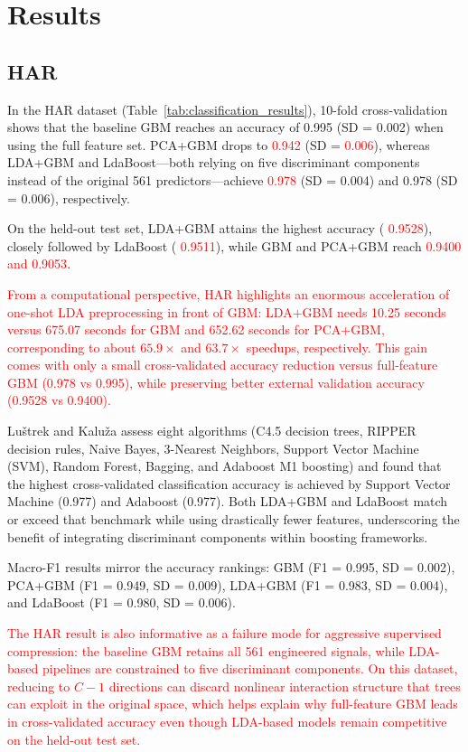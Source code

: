 \documentclass[11pt,a4paper]{article}
\providecommand{\DIFaddtex}[1]{\textcolor{red}{#1}}
\providecommand{\DIFaddbegin}{}
\providecommand{\DIFaddend}{}
\providecommand{\DIFadd}[1]{\texorpdfstring{\DIFaddtex{#1}}{#1}}
\begin{document}
\DIFaddend \section*{Results}
\subsection*{HAR}
In the HAR dataset (Table~\ref{tab:classification_results}), 10-fold cross-validation shows that the baseline GBM reaches an accuracy of 0.995 (SD = 0.002) when using the full feature set. PCA+GBM drops to  \DIFaddbegin \DIFadd{0.942 }\DIFaddend (SD =  \DIFaddbegin \DIFadd{0.006}\DIFaddend ), whereas LDA+GBM and LdaBoost---both relying on five discriminant components instead of the original 561 predictors---achieve  \DIFaddbegin \DIFadd{0.978 }\DIFaddend (SD = 0.004) and 0.978 (SD = 0.006), respectively.

On the held-out test set, LDA+GBM attains the highest accuracy ( \DIFaddbegin \DIFadd{0.9528}\DIFaddend ), closely followed by LdaBoost ( \DIFaddbegin \DIFadd{0.9511}\DIFaddend ), while GBM and PCA+GBM reach  \DIFaddbegin \DIFadd{0.9400 and 0.9053}\DIFaddend .

\DIFaddbegin \DIFadd{From a computational perspective, HAR highlights an enormous acceleration of one-shot LDA preprocessing in front of GBM: LDA+GBM needs 10.25 seconds versus 675.07 seconds for GBM and 652.62 seconds for PCA+GBM, corresponding to about $65.9\times$ and $63.7\times$ speedups, respectively. This gain comes with only a small cross-validated accuracy reduction versus full-feature GBM (0.978 vs 0.995), while preserving better external validation accuracy (0.9528 vs 0.9400).
}

\DIFaddend Luštrek and Kaluža \citep{luvstrek2009fall} assess eight algorithms (C4.5 decision trees, RIPPER decision rules, Naive Bayes, 3-Nearest Neighbors, Support Vector Machine (SVM), Random Forest, Bagging, and Adaboost M1 boosting) and found that the highest cross-validated classification accuracy is achieved by Support Vector Machine (0.977) and Adaboost (0.977). Both LDA+GBM and LdaBoost match or exceed that benchmark while using drastically fewer features, underscoring the benefit of integrating discriminant components within boosting frameworks.

Macro-F1 results mirror the accuracy rankings: GBM (F1 = 0.995, SD = 0.002), PCA+GBM (F1 = 0.949, SD = 0.009), LDA+GBM (F1 = 0.983, SD = 0.004), and LdaBoost (F1 = 0.980, SD = 0.006).

\DIFaddbegin \DIFadd{The HAR result is also informative as a failure mode for aggressive supervised compression: the baseline GBM retains all 561 engineered signals, while LDA-based pipelines are constrained to five discriminant components. On this dataset, reducing to $C-1$ directions can discard nonlinear interaction structure that trees can exploit in the original space, which helps explain why full-feature GBM leads in cross-validated accuracy even though LDA-based models remain competitive on the held-out test set.
}
\end{document}
